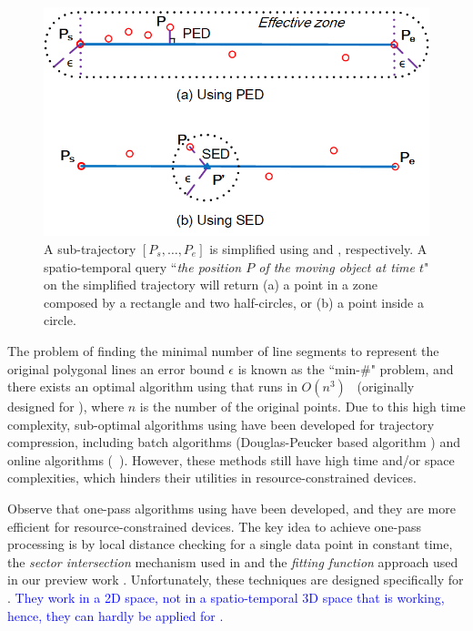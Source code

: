 \begin{figure}[tb!]
\centering
\includegraphics[scale=1.2]{figures/Fig-Distances.png}
\caption{\small A sub-trajectory $[P_s, \ldots, P_e]$ is simplified using \ped and \sed, respectively. A spatio-temporal query ``\emph{the position $P$ of the moving object at time $t$}" on the simplified trajectory will return (a) a point in a zone composed by a rectangle and two half-circles, or (b) a point inside a circle.}
\vspace{-3ex}
\label{fig:distances}
\end{figure}

%
%

The problem of finding the minimal number of line segments to represent the original polygonal lines \wrt an error bound $\epsilon$ is known as the ``min-\#" problem\cite{Imai:Optimal,Chan:Optimal}, and there exists an optimal \lsa algorithm using \sed that runs in $O(n^3)$~\cite{Imai:Optimal} (originally designed for \ped ),  where $n$ is the number of the original points.
Due to this high time complexity, sub-optimal \lsa algorithms using \sed have been developed for trajectory compression, including batch algorithms (\eg Douglas-Peucker based algorithm \dpsed \cite{Meratnia:Spatiotemporal}) and online algorithms (\eg\ \squishe \cite{Muckell:Compression}).
However, these methods still have high time and/or space complexities, which hinders their utilities in resource-constrained devices. %


Observe that one-pass \lsa algorithms using \ped \cite{Williams:Longest, Sklansky:Cone, Dunham:Cone, Zhao:Sleeve, Lin:Operb} have been developed, and they are more efficient for resource-constrained devices.
%
The key idea to achieve one-pass processing is by local distance checking for a single data point in constant time, \eg the \textit{sector intersection} mechanism used in \cite{Williams:Longest, Sklansky:Cone, Dunham:Cone, Zhao:Sleeve} and the \textit{fitting function} approach used in our preview work \cite {Lin:Operb}.
Unfortunately, these techniques are designed specifically for \ped. \textcolor{blue}{They work in a 2D space, not in a spatio-temporal 3D space that \sed is working, hence, they can hardly be applied for \sed.}


